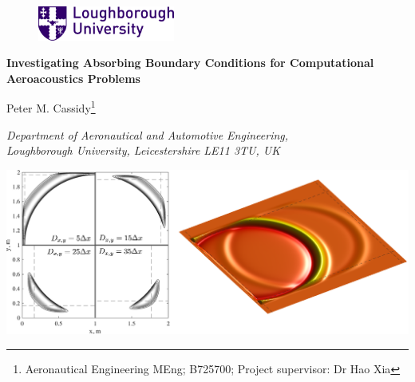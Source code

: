 
\begin{figure}
    \includegraphics[width=0.4\textwidth,right]{Figures/Misc/LULogo.png}
\end{figure}


\begin{titlepage}

   \begin{center}

    	\Large{\textbf{Investigating Absorbing Boundary Conditions for Computational Aeroacoustics Problems}}

       \vspace{0.8cm}

       \footnotesize{Peter M. Cassidy\footnote[1]{Aeronautical Engineering MEng; B725700; Project supervisor: Dr Hao Xia}}


       \textit{Department of Aeronautical and Automotive Engineering,\\
       Loughborough University, Leicestershire LE11 3TU, UK}
       
       \vspace{0.8cm}
     
       \includegraphics[width=16cm]{Figures/Misc/Summary.eps}
            
            
   \end{center}
   
   
\end{titlepage}